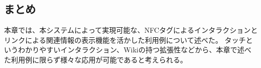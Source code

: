 \subsection{まとめ}
本章では、本システムによって実現可能な、NFCタグによるインタラクションとリンクによる関連情報の表示機能を活かした利用例について述べた。
タッチというわかりやすいインタラクション、Wikiの持つ拡張性などから、本章で述べた利用例に限らず様々な応用が可能であると考えられる。